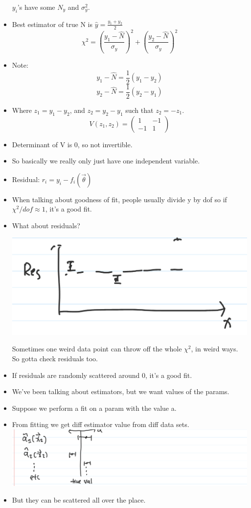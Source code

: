 \begin{itemize}
          $y_i$'s have some $N_y$ and $\sigma_y^2$.
    \item Best estimator of true N is $\hat{y} = \frac{y_1+y_2}{2}$
          \[ \chi^2 = \left(\frac{y_1 - \hat{N}}{\sigma_y}\right)^2 + \left(\frac{y_2 - \hat{N}}{\sigma_y}\right)^2 \]
    \item Note:
          \[ y_1 - \hat{N} = \frac{1}{2} (y_1 - y_2)\]
          \[ y_2 - \hat{N} = \frac{1}{2} ( y_2- y_1)\]
    \item Where $z_1 = y_1 - y_2$, and $z_2 = y_2 - y_1$ such that $z_2 = - z_1$.
          \[ V(z_1, z_2) = \begin{pmatrix}
                  1  & -1 \\
                  -1 & 1
              \end{pmatrix} \]
    \item Determinant of V is 0, so not invertible.
    \item So basically we really only just have one independent variable.
    \item Residual: $ r_i = y_i - f_i(\vec{\theta})$
    \item When talking about goodness of fit, people usually divide y by dof so if $\chi^2/dof \approx 1$, it's a good fit.
    \item What about residuals?

          \includegraphics[width=0.5\linewidth]{Images/lec11-residual.png}

          Sometimes one weird data point can throw off the whole $\chi^2$, in weird ways. So gotta check residuals too.
    \item If residuals are randomly scattered around 0, it's a good fit.

          \divider
    \item We've been talking about estimators, but we want values of the params.
    \item Suppose we perform a fit on a param with the value a.
    \item From fitting we get diff estimator value from diff data sets.
          \includegraphics[width = 0.5 \linewidth]{Images/lec11-spread-est-vals.png}
    \item But they can be scattered all over the place.


\end{itemize}
